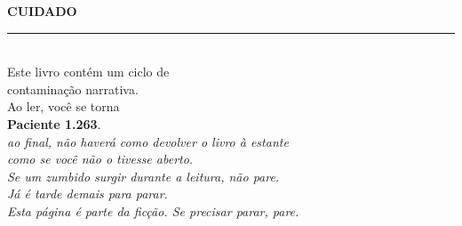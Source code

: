 \thispagestyle{empty}
\begin{center}
\vspace*{0.18\textheight}
{\color{sangue}\fontsize{40}{44}\selectfont\bfseries CUIDADO}\\[0.8em]
{\color{sangue}\rule{0.35\textwidth}{1.2pt}}\\[1.6em]
{\large Este livro contém um ciclo de\\ contaminação narrativa.}\\[1.2em]
{\large Ao ler, você se torna\\ \textbf{Paciente 1.263}.}\\[2em]
{\itshape ao final, não haverá como devolver o livro à estante\\ como se você não o tivesse aberto.}\\[2em]
{\itshape Se um zumbido surgir durante a leitura, não pare.\\ Já é tarde demais para parar.}\\[1.2em]
{\itshape Esta página é parte da ficção. Se precisar parar, pare.}
\end{center}
\vfill
